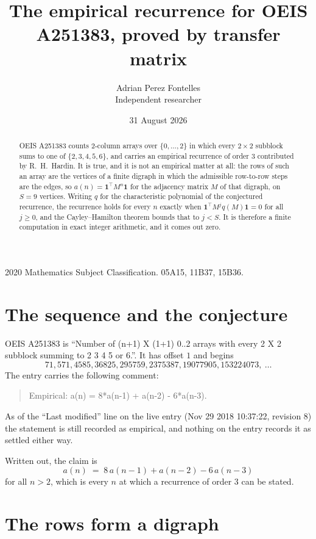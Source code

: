\documentclass[11pt,a4paper]{article}
\title{The empirical recurrence for OEIS A251383, proved by transfer matrix}
\author{Adrian Perez Fontelles\\ \small Independent researcher}
\date{31 August 2026}
\theoremstyle{plain}
\theoremstyle{definition}
\begin{document}
\maketitle

\begin{abstract}
OEIS A251383 counts $2$-column arrays over $\{0,\dots,2\}$ in which every
$2\times2$ subblock sums to one of $\{2, 3, 4, 5, 6\}$, and carries an empirical
recurrence of order $3$ contributed by R.~H.~Hardin. It is true, and it is not an
empirical matter at all: the rows of such an array are the vertices of a finite digraph in
which the admissible row-to-row steps are the edges, so $a(n)=\mathbf{1}^{\!\top}M^{n}
\mathbf{1}$ for the adjacency matrix $M$ of that digraph, on $S=9$ vertices. Writing
$q$ for the characteristic polynomial of the conjectured recurrence, the recurrence holds
for every $n$ exactly when $\mathbf{1}^{\!\top}M^{j}q(M)\mathbf{1}=0$ for all
$j\ge0$, and the Cayley--Hamilton theorem bounds that to $j<S$. It is therefore a finite
computation in exact integer arithmetic, and it comes out zero.
\end{abstract}

\noindent\small 2020 Mathematics Subject Classification. 05A15, 11B37, 15B36.\normalsize

\section{The sequence and the conjecture}

OEIS A251383 is ``Number of (n+1) X (1+1) 0..2 arrays with every 2 X 2 subblock summing to 2 3 4 5 or 6.''. It has offset $1$
and begins
\[
71, 571, 4585, 36825, 295759, 2375387, 19077905, 153224073,\ \dots
\]
The entry carries the following comment:
\begin{quote}\small
Empirical: a(n) = 8*a(n-1) + a(n-2) - 6*a(n-3).
\end{quote}
As of the ``Last modified'' line on the live entry (Nov 29 2018 10:37:22, revision 8) the statement is
still recorded as empirical, and nothing on the entry records it as settled either way.

Written out, the claim is
\begin{equation}\label{eq:conj}
a(n)\;=\;8\,a(n-1) + a(n-2) - 6\,a(n-3)
\end{equation}
for all $n>2$, which is every $n$ at which a recurrence of order $3$ can be
stated.

\section{The rows form a digraph}
\end{document}
